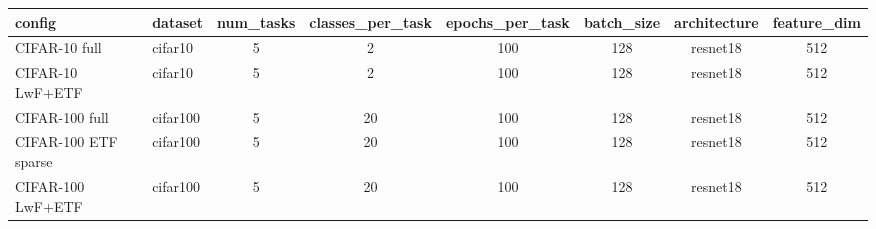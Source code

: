 \begin{tabular}{llcccccc}
\hline
config & dataset & num\_tasks & classes\_per\_task & epochs\_per\_task & batch\_size & architecture & feature\_dim \\
\hline
CIFAR-10 full & cifar10 & 5 & 2 & 100 & 128 & resnet18 & 512 \\
CIFAR-10 LwF+ETF & cifar10 & 5 & 2 & 100 & 128 & resnet18 & 512 \\
CIFAR-100 full & cifar100 & 5 & 20 & 100 & 128 & resnet18 & 512 \\
CIFAR-100 ETF sparse & cifar100 & 5 & 20 & 100 & 128 & resnet18 & 512 \\
CIFAR-100 LwF+ETF & cifar100 & 5 & 20 & 100 & 128 & resnet18 & 512 \\
\hline
\end{tabular}

